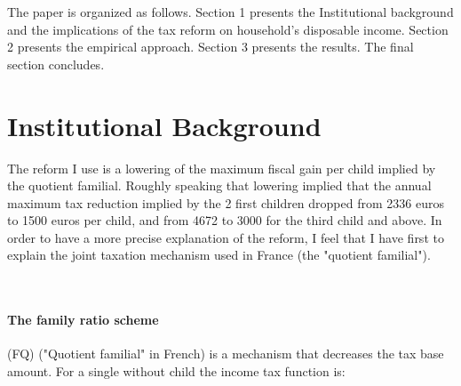 







The paper is organized as follows. Section 1 presents the Institutional background and the implications of the tax reform on household’s disposable income. Section 2 presents the empirical approach. Section 3 presents the results. The final section concludes.
 
\newpage

\section{Institutional Background}




The reform I use is a lowering of the maximum fiscal gain per child implied by the quotient familial. Roughly speaking that lowering implied that the annual maximum tax reduction implied by the 2 first children dropped from 2336 euros to 1500 euros per child, and from 4672 to 3000 for the third child and above. In order to have a more precise explanation of the reform, I feel that I have first to explain the joint taxation mechanism used in France (the "quotient familial").
  
\
 
 \paragraph{The family ratio scheme} (FQ) ("Quotient familial" in French) is a mechanism that decreases the tax base amount.
For a single without child the income tax function is:

